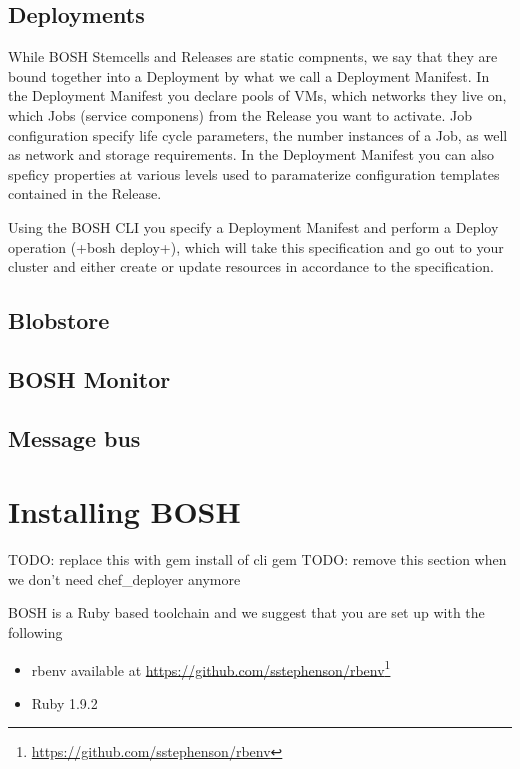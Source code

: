 \section{Deployments}
\label{deployments}

While BOSH Stemcells and Releases are static compnents, we say that they
are bound together into a Deployment by what we call a Deployment
Manifest. In the Deployment Manifest you declare pools of VMs, which
networks they live on, which Jobs (service componens) from the Release
you want to activate. Job configuration specify life cycle parameters,
the number instances of a Job, as well as network and storage
requirements. In the Deployment Manifest you can also speficy properties
at various levels used to paramaterize configuration templates contained
in the Release.

Using the BOSH CLI you specify a Deployment Manifest and perform a
Deploy operation (+bosh deploy+), which will take this specification and
go out to your cluster and either create or update resources in
accordance to the specification.

\section{Blobstore}
\label{blobstore}

\section{BOSH Monitor}
\label{boshmonitor}

\section{Message bus}
\label{messagebus}

\chapter{Installing BOSH}
\label{installingbosh}

TODO: replace this with gem install of cli gem
TODO: remove this section when we don't need chef\_deployer anymore

BOSH is a Ruby based toolchain and we suggest that you are set up with
the following

\begin{itemize}
\item rbenv available at \href{https://github.com/sstephenson/rbenv}{https:/\slash github.com\slash sstephenson\slash rbenv}\footnote{\href{https://github.com/sstephenson/rbenv}{https:/\slash github.com\slash sstephenson\slash rbenv}}

\item Ruby 1.9.2

\end{itemize}

